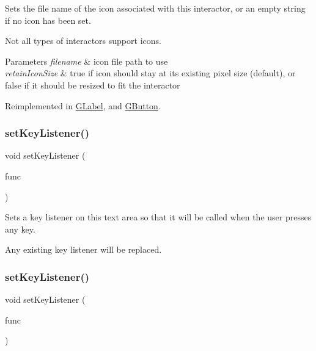 Sets the file name of the icon associated with this interactor, or an empty string if no icon has been set. 

Not all types of interactors support icons. 
\begin{DoxyParams}{Parameters}
{\em filename} & icon file path to use \\
\hline
{\em retain\+Icon\+Size} & true if icon should stay at its existing pixel size (default), or false if it should be resized to fit the interactor \\
\hline
\end{DoxyParams}


Reimplemented in \mbox{\hyperlink{classGLabel_a75753a3d7d3364185f8088d63b664cb1}{G\+Label}}, and \mbox{\hyperlink{classGButton_a75753a3d7d3364185f8088d63b664cb1}{G\+Button}}.

\mbox{\label{classGTextArea_aeb8324d3287fa1fbe093f4d6230cf0a6}} 
\subsubsection{\texorpdfstring{set\+Key\+Listener()}{setKeyListener()}\hspace{0.1cm}{\footnotesize\ttfamily [1/2]}}
{\footnotesize\ttfamily void set\+Key\+Listener (\begin{DoxyParamCaption}\item[{G\+Event\+Listener}]{func }\end{DoxyParamCaption})\hspace{0.3cm}{\ttfamily [virtual]}}



Sets a key listener on this text area so that it will be called when the user presses any key. 

Any existing key listener will be replaced. \mbox{\label{classGTextArea_ae48ecea73606c7bd9423e1c7cc589cc9}} 
\subsubsection{\texorpdfstring{set\+Key\+Listener()}{setKeyListener()}\hspace{0.1cm}{\footnotesize\ttfamily [2/2]}}
{\footnotesize\ttfamily void set\+Key\+Listener (\begin{DoxyParamCaption}\item[{G\+Event\+Listener\+Void}]{func }\end{DoxyParamCaption})\hspace{0.3cm}{\ttfamily [virtual]}}



